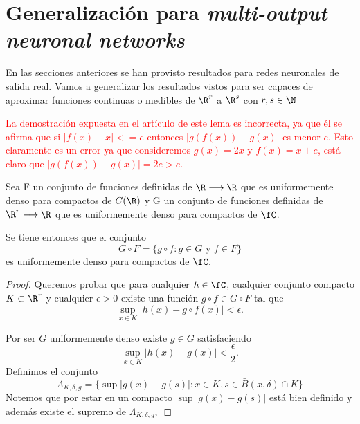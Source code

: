 %
\section{Generalización para \textit{multi-output neuronal networks}}

En las secciones anteriores se han provisto resultados para redes 
neuronales de salida real. Vamos a generalizar los resultados vistos
para ser capaces de aproximar funciones continuas o medibles 
de $\R^r$ a $\R^s$ con $r,s \in \N$


\textcolor{red}{La demostración expuesta en el artículo de este lema es incorrecta, ya que él se afirma que 
si $|f(x) - x| <= e$ entonces $|g(f(x))- g(x)|$ es menor $e$. Esto claramente es un error ya que 
consideremos $g(x) = 2x$ y $f(x)=x+e$, está claro que $|g(f(x))- g(x)|=2e>e$.}
\begin{lema}
    Sea F un conjunto de funciones definidas de $\R \longrightarrow \R$ que es uniformemente 
    denso para compactos de $C(\R)$ y
    G un conjunto de funciones definidas de $\R^r \longrightarrow \R$ que es uniformemente 
    denso para compactos de $\fC$.
    
    Se tiene entonces que el conjunto 
    \begin{equation}
        G \circ F 
        = 
        \{
            g \circ f : g \in G \text{ y } f \in F
        \}
    \end{equation}
    es uniformemente denso para compactos de $\fC.$
\end{lema}
\begin{proof}
    Queremos probar que para cualquier $h \in \fC$, cualquier conjunto compacto $K \subset \R^r$ 
    y cualquier $\epsilon >0$
    existe una función $g \circ f \in G \circ F$ tal que 
    \begin{equation}
        \sup_{x \in K}|h(x) - g \circ f(x)| < \epsilon.
    \end{equation}

    Por ser $G$ uniformemente denso existe $g \in G$ satisfaciendo 
    \begin{equation}
        \sup_{x \in K}|h(x) - g(x)| < \frac{\epsilon}{2}.
    \end{equation}
    Definimos el conjunto 
    \begin{equation}
        \Lambda_{K, \delta, g} 
        = 
        \{
           \sup|g(x) - g(s)| : x \in K, s \in \bar{B}(x,\delta) \cap K 
        \}
    \end{equation}
    Notemos que por estar en un compacto $\sup|g(x) - g(s)|$ está bien definido 
    y además existe el supremo de $\Lambda_{K, \delta, g}, $

\end{proof}